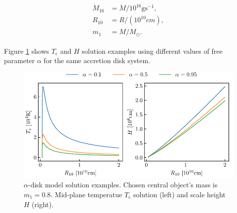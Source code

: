     \begin{align}
    \begin{split}
        \dot{M}_{16} &= \dot{M} / 10^{16} \si{\gram \second^{-1}}, \\
        R_{10} &= R / (10^{10} \si{cm}), \\
        m_1 &= M / M_{\odot}.
    \end{split} 
    \end{align}

    Figure \ref{fig:plot_alpha_H_T} shows $T_{\mathrm{c}}$ and $H$ solution examples using different values of free parameter $\alpha$ for the same accretion disk system.

    \begin{figure}[H]
        \centering
        \includegraphics[scale=1.0]{img/plot_alpha_H_T.pdf}
        \caption{$\alpha$-disk model solution examples. Chosen central object's mass is $m_1 = 0.8$. Mid-plane temperatue $T_{\mathrm{c}}$ solution (left) and scale height $H$ (right).}
        \label{fig:plot_alpha_H_T}
    \end{figure}
